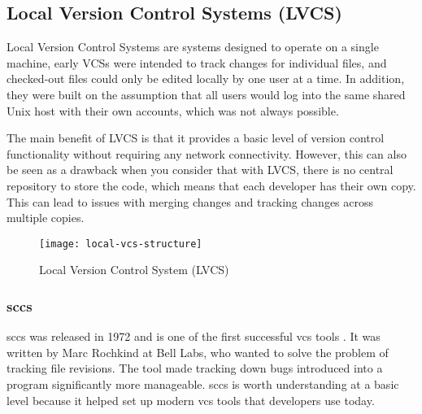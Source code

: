 \subsection{Local Version Control Systems (LVCS)}
Local Version Control Systems are systems designed to operate on a single machine, early VCSs were intended to track changes for individual files, and checked-out files could only be edited locally by one user at a time. In addition, they were built on the assumption that all users would log into the same shared Unix host with their own accounts, which was not always possible.
\smallskip

The main benefit of LVCS is that it provides a basic level of version control functionality without requiring any network connectivity. However, this can also be seen as a drawback when you consider that with LVCS, there is no central repository to store the code, which means that each developer has their own copy. This can lead to issues with merging changes and tracking changes across multiple copies.

\begin{figure}[htbp]
    \centering
    \texttt{[image: local-vcs-structure]}
    \caption{Local Version Control System (LVCS)}
    \label{fig:lvcs-structure}
\end{figure}

\subsubsection{\texorpdfstring{\acrfull*{sccs}}{Source Code Control System (SCCS)}}
\label{sec:sccs}
\acrlong{sccs} was released in 1972 and is one of the first successful \acrshort{vcs} tools \cite{stopak_2019}. It was written by Marc Rochkind at Bell Labs, who wanted to solve the problem of tracking file revisions. The tool made tracking down bugs introduced into a program significantly more manageable. \acrshort{sccs} is worth understanding at a basic level because it helped set up modern \acrshort{vcs} tools that developers use today.
